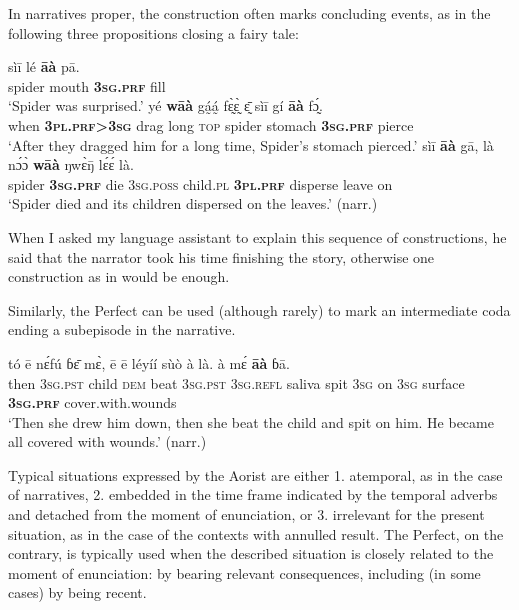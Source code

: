 \documentclass[output=paper,newtxmath,modfonts,nonflat,hidelinks]{langsci/langscibook}
\begin{document}
In narratives proper, the  construction often marks concluding events, as in the following three propositions closing a fairy tale:

\begin{exe} \ex
\begin{xlist} \ex
\gll	sìī	lé	\textbf{āà}	pā.\\
		spider	mouth	\textbf{3\textsc{sg}.\textsc{prf}}	fill\\
\glt ‘Spider was surprised.’
\ex
\gll yé	\textbf{wāà}	gá̰á̰	fɛ̰̀ɛ̰̀	ɛ̰̄	sìī	gí	\textbf{āà}	fɔ̰́.\\
		when	\textbf{3\textsc{pl}.\textsc{prf}>3\textsc{sg}}	drag	long	\textsc{top}	spider stomach	\textbf{3\textsc{sg}.\textsc{prf}}	pierce \\
\glt ‘After they dragged him for a long time, Spider’s stomach pierced.’
\ex	
\label{khachexspider}
\gll sìī	\textbf{āà}	gā,	là	nɔ́ɔ̀	\textbf{wāà}	ŋwɛ̀ŋ̄	lɛ́ɛ́	là.\\
		spider	\textbf{3\textsc{sg}.\textsc{prf}}	die	3\textsc{sg}.\textsc{poss}	child.\textsc{pl}	\textbf{3\textsc{pl}.\textsc{prf}}	disperse	leave	on\\
\glt  ‘Spider died and its children dispersed on the leaves.’ (narr.)
\end{xlist}
\end{exe}

When I asked my language assistant to explain this sequence of  constructions, he said that the narrator took his time finishing the story, otherwise one  construction as in  would be enough.

Similarly, the Perfect can be used (although rarely) to mark an intermediate coda ending a subepisode in the narrative. 

\begin{exe} \ex
\gll 	tó	ē	nɛ́fú	ɓɛ̄	mɛ̀,	ē	ē	léyíí	sùò	à	là. à	mɛ́	\textbf{āà}	ɓā.\\
	then	3\textsc{sg}.\textsc{pst}	child	\textsc{dem}	beat	3\textsc{sg}.\textsc{pst}	3\textsc{sg}.\textsc{refl}	saliva	spit	3\textsc{sg}	on 3\textsc{sg}	surface	\textbf{3\textsc{sg}.\textsc{prf}}	cover.with.wounds\\
\glt ‘Then she drew him down, then she beat the child and spit on him. He became all covered with wounds.’ (narr.)
\end{exe}



Typical situations expressed by the Aorist are either 1. atemporal, as in the case of narratives, 2. embedded in the time frame indicated by the temporal adverbs and detached from the moment of enunciation, or 3. irrelevant for the present situation, as in the case of the contexts with annulled result. The Perfect, on the contrary, is typically used when the described situation  is closely related to the moment of enunciation:  by bearing relevant consequences, including (in some cases) by being recent.
\end{document}
